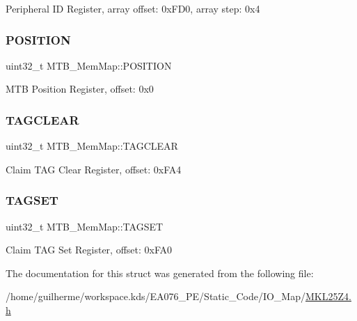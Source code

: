 Peripheral ID Register, array offset\+: 0x\+F\+D0, array step\+: 0x4 \mbox{\label{struct_m_t_b___mem_map_af02973e301b85c6ea0c6ba7520b59173}} 
\subsubsection{\texorpdfstring{P\+O\+S\+I\+T\+I\+ON}{POSITION}}
{\footnotesize\ttfamily uint32\+\_\+t M\+T\+B\+\_\+\+Mem\+Map\+::\+P\+O\+S\+I\+T\+I\+ON}

M\+TB Position Register, offset\+: 0x0 \mbox{\label{struct_m_t_b___mem_map_a341492ac466b6c26b188093417006f72}} 
\subsubsection{\texorpdfstring{T\+A\+G\+C\+L\+E\+AR}{TAGCLEAR}}
{\footnotesize\ttfamily uint32\+\_\+t M\+T\+B\+\_\+\+Mem\+Map\+::\+T\+A\+G\+C\+L\+E\+AR}

Claim T\+AG Clear Register, offset\+: 0x\+F\+A4 \mbox{\label{struct_m_t_b___mem_map_a5709bb3455f82d56406ad14e3a8c182e}} 
\subsubsection{\texorpdfstring{T\+A\+G\+S\+ET}{TAGSET}}
{\footnotesize\ttfamily uint32\+\_\+t M\+T\+B\+\_\+\+Mem\+Map\+::\+T\+A\+G\+S\+ET}

Claim T\+AG Set Register, offset\+: 0x\+F\+A0 

The documentation for this struct was generated from the following file\+:\begin{DoxyCompactItemize}
\item 
/home/guilherme/workspace.\+kds/\+E\+A076\+\_\+\+P\+E/\+Static\+\_\+\+Code/\+I\+O\+\_\+\+Map/\hyperlink{_m_k_l25_z4_8h}{M\+K\+L25\+Z4.\+h}\end{DoxyCompactItemize}
